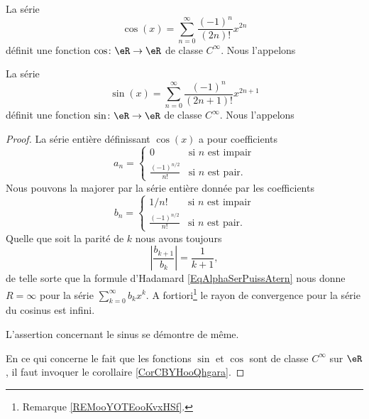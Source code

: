 \begin{propositionDef}        \label{PROPooZXPVooBjONka}
    La série
    \begin{equation}
        \cos(x)=\sum_{n=0}^{\infty}\frac{ (-1)^n }{ (2n)! }x^{2n}
    \end{equation}
    définit une fonction \( \cos\colon \eR\to \eR\) de classe \(  C^{\infty}\). Nous l'appelons 

    La série
    \begin{equation}        \label{EQooCMRFooCTtpge}
        \sin(x)=\sum_{n=0}^{\infty}\frac{ (-1)^n }{ (2n+1)! }x^{2n+1}
    \end{equation}
    définit une fonction \( \sin\colon \eR\to \eR\) de classe \(  C^{\infty}\). Nous l'appelons 
\end{propositionDef}

\begin{proof}
    La série entière définissant \( \cos(x)\) a pour coefficients
    \begin{equation}
        a_n=\begin{cases}
            0    &   \text{si } n\text{ est impair}\\
            \frac{ (-1)^{n/2} }{ n! }    &   \text{si } n\text{ est pair}.
        \end{cases}
    \end{equation}
    Nous pouvons la majorer par la série entière donnée par les coefficients
    \begin{equation}
        b_n=\begin{cases}
            1/n!    &   \text{si } n\text{ est impair}\\
            \frac{ (-1)^{n/2} }{ n! }    &   \text{si } n\text{ est pair}.
        \end{cases}
    \end{equation}
    Quelle que soit la parité de \( k\) nous avons toujours
    \begin{equation}
        | \frac{ b_{k+1} }{ b_k } |=\frac{1}{ k+1 },
    \end{equation}
    de telle sorte que la formule d'Hadamard \eqref{EqAlphaSerPuissAtern} nous donne \( R=\infty\) pour la série \( \sum_{k=0}^{\infty}b_kx^k\). A fortiori\footnote{Remarque \ref{REMooYOTEooKvxHSf}.} le rayon de convergence pour la série du cosinus est infini.

    L'assertion concernant le sinus se démontre de même.

    En ce qui concerne le fait que les fonctions \( \sin\) et \( \cos\) sont de classe \(  C^{\infty}\) sur \( \eR\), il faut invoquer le corollaire \ref{CorCBYHooQhgara}.
\end{proof}

